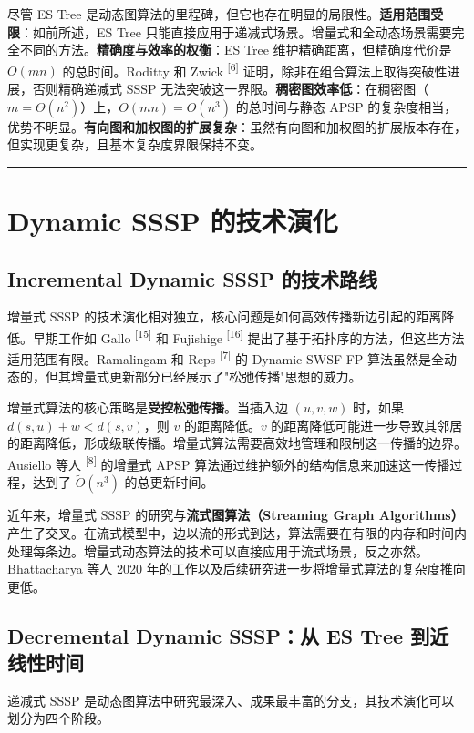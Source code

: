 \documentclass[12pt,a4paper]{ctexart}
\let\oldsection\section
\renewcommand{\section}{\clearpage\oldsection}
\begin{document}
尽管 ES Tree 是动态图算法的里程碑，但它也存在明显的局限性。\textbf{适用范围受限}：如前所述，ES Tree 只能直接应用于递减式场景。增量式和全动态场景需要完全不同的方法。\textbf{精确度与效率的权衡}：ES Tree 维护精确距离，但精确度代价是 $O(mn)$ 的总时间。Roditty 和 Zwick \textsuperscript{[6]}  证明，除非在组合算法上取得突破性进展，否则精确递减式 SSSP 无法突破这一界限。\textbf{稠密图效率低}：在稠密图（$m=\Theta(n^2)$）上，$O(mn)=O(n^3)$ 的总时间与静态 APSP 的复杂度相当，优势不明显。\textbf{有向图和加权图的扩展复杂}：虽然有向图和加权图的扩展版本存在，但实现更复杂，且基本复杂度界限保持不变。

\noindent\rule{\textwidth}{0.4pt}
\section{Dynamic SSSP 的技术演化}

\subsection{Incremental Dynamic SSSP 的技术路线}

增量式 SSSP 的技术演化相对独立，核心问题是如何高效传播新边引起的距离降低。早期工作如 Gallo \textsuperscript{[15]}  和 Fujishige \textsuperscript{[16]}  提出了基于拓扑序的方法，但这些方法适用范围有限。Ramalingam 和 Reps \textsuperscript{[7]}  的 Dynamic SWSF-FP 算法虽然是全动态的，但其增量式更新部分已经展示了"松弛传播"思想的威力。

增量式算法的核心策略是\textbf{受控松弛传播}。当插入边 $(u,v,w)$ 时，如果 $d(s,u)+w<d(s,v)$，则 $v$ 的距离降低。$v$ 的距离降低可能进一步导致其邻居的距离降低，形成级联传播。增量式算法需要高效地管理和限制这一传播的边界。Ausiello 等人 \textsuperscript{[8]}  的增量式 APSP 算法通过维护额外的结构信息来加速这一传播过程，达到了 $\tilde{O}(n^3)$ 的总更新时间。

近年来，增量式 SSSP 的研究与\textbf{流式图算法（Streaming Graph Algorithms）}产生了交叉。在流式模型中，边以流的形式到达，算法需要在有限的内存和时间内处理每条边。增量式动态算法的技术可以直接应用于流式场景，反之亦然。Bhattacharya 等人 2020 年的工作以及后续研究进一步将增量式算法的复杂度推向更低。

\subsection{Decremental Dynamic SSSP：从 ES Tree 到近线性时间}

递减式 SSSP 是动态图算法中研究最深入、成果最丰富的分支，其技术演化可以划分为四个阶段。
\end{document}
